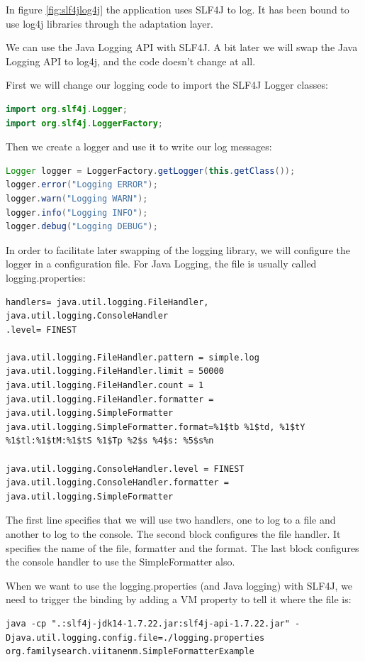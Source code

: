 In figure \ref{fig:slf4jlog4j} the application uses SLF4J to log. It has been bound to use log4j libraries through the adaptation layer. 

We can use the Java Logging API with SLF4J. A bit later we will swap the Java Logging API to log4j, and the code doesn't change at all.

First we will change our logging code to import the SLF4J Logger classes:
\begin{lstlisting}[language=Java]
import org.slf4j.Logger;
import org.slf4j.LoggerFactory;
\end{lstlisting}

Then we create a logger and use it to write our log messages:
\begin{lstlisting}[language=Java]
Logger logger = LoggerFactory.getLogger(this.getClass());
logger.error("Logging ERROR");
logger.warn("Logging WARN");
logger.info("Logging INFO");
logger.debug("Logging DEBUG");
\end{lstlisting}

In order to facilitate later swapping of the logging library, we will configure the logger in a configuration file. For Java Logging, the file is usually called logging.properties:
\begin{lstlisting}
handlers= java.util.logging.FileHandler, java.util.logging.ConsoleHandler
.level= FINEST

java.util.logging.FileHandler.pattern = simple.log
java.util.logging.FileHandler.limit = 50000
java.util.logging.FileHandler.count = 1
java.util.logging.FileHandler.formatter = java.util.logging.SimpleFormatter
java.util.logging.SimpleFormatter.format=%1$tb %1$td, %1$tY %1$tl:%1$tM:%1$tS %1$Tp %2$s %4$s: %5$s%n

java.util.logging.ConsoleHandler.level = FINEST
java.util.logging.ConsoleHandler.formatter = java.util.logging.SimpleFormatter
\end{lstlisting}

The first line specifies that we will use two handlers, one to log to a file and another to log to the console. The second block configures the file handler. It specifies the name of the file, formatter and the format. The last block configures the console handler to use the SimpleFormatter also.

When we want to use the logging.properties (and Java logging) with SLF4J, we need to trigger the binding by adding a VM property to tell it where the file is:
\begin{lstlisting}
java -cp ".:slf4j-jdk14-1.7.22.jar:slf4j-api-1.7.22.jar" -Djava.util.logging.config.file=./logging.properties org.familysearch.viitanenm.SimpleFormatterExample
\end{lstlisting}

